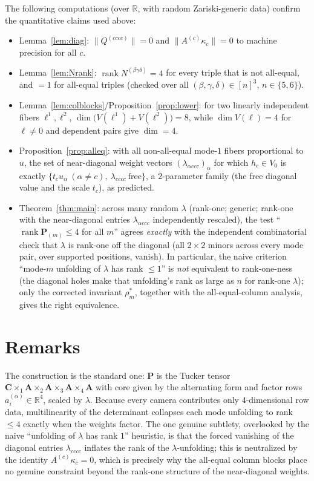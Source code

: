 \documentclass[12pt]{article}
\DeclareMathOperator{\rank}{rank}
\newcommand{\bR}{\mathbb{R}}
\theoremstyle{definition}
\begin{document}
The following computations (over $\bR$, with random Zariski-generic data) confirm the
quantitative claims used above:
\begin{itemize}
\item Lemma~\ref{lem:diag}: $\|Q^{(cccc)}\|=0$ and $\|A^{(c)}\kappa_c\|=0$ to machine
precision for all $c$.
\item Lemma~\ref{lem:Nrank}: $\rank N^{(\beta\gamma\delta)}=4$ for every triple that
is not all-equal, and $=1$ for all-equal triples (checked over all
$(\beta,\gamma,\delta)\in[n]^3$, $n\in\{5,6\}$).
\item Lemma~\ref{lem:colblocks}/Proposition~\ref{prop:lower}: for two linearly
independent fibers $\ell^1,\ell^2$, $\dim\bigl(V(\ell^1)+V(\ell^2)\bigr)=8$, while
$\dim V(\ell)=4$ for $\ell\ne0$ and dependent pairs give $\dim=4$.
\item Proposition~\ref{prop:alleq}: with all non-all-equal mode-$1$ fibers
proportional to $u$, the set of near-diagonal weight vectors
$(\lambda_{\alpha ccc})_{\alpha}$ for which $h_c\in V_0$ is exactly
$\{t_cu_\alpha\ (\alpha\ne c),\ \lambda_{cccc}\ \text{free}\}$, a $2$-parameter
family (the free diagonal value and the scale $t_c$), as predicted.
\item Theorem~\ref{thm:main}: across many random $\lambda$ (rank-one; generic;
rank-one with the near-diagonal entries $\lambda_{\alpha ccc}$ independently
rescaled), the test ``$\rank\mathbf P_{(m)}\le4$ for all $m$'' agrees \emph{exactly}
with the independent combinatorial check that $\lambda$ is rank-one off the diagonal
(all $2\times2$ minors across every mode pair, over supported positions, vanish).
In particular, the naive criterion ``mode-$m$ unfolding of $\lambda$ has rank
$\le1$'' is \emph{not} equivalent to rank-one-ness (the diagonal holes make that
unfolding's rank as large as $n$ for rank-one $\lambda$); only the corrected
invariant $\rho_m^\ast$, together with the all-equal-column analysis, gives the right
equivalence.
\end{itemize}

\section*{Remarks}

The construction is the standard one: $\mathbf P$ is the Tucker tensor
$\mathbf C\times_1\mathbf A\times_2\mathbf A\times_3\mathbf A\times_4\mathbf A$ with
core given by the alternating form and factor rows $a^{(\alpha)}_i\in\bR^4$, scaled by
$\lambda$.  Because every camera contributes only $4$-dimensional row data,
multilinearity of the determinant collapses each mode unfolding to rank $\le4$ exactly
when the weights factor.  The one genuine subtlety, overlooked by the naive
``unfolding of $\lambda$ has rank $1$'' heuristic, is that the forced vanishing of the
diagonal entries $\lambda_{cccc}$ inflates the rank of the $\lambda$-unfolding; this is
neutralized by the identity $A^{(c)}\kappa_c=0$, which is precisely why the all-equal
column blocks place no genuine constraint beyond the rank-one structure of the
near-diagonal weights.
\end{document}
